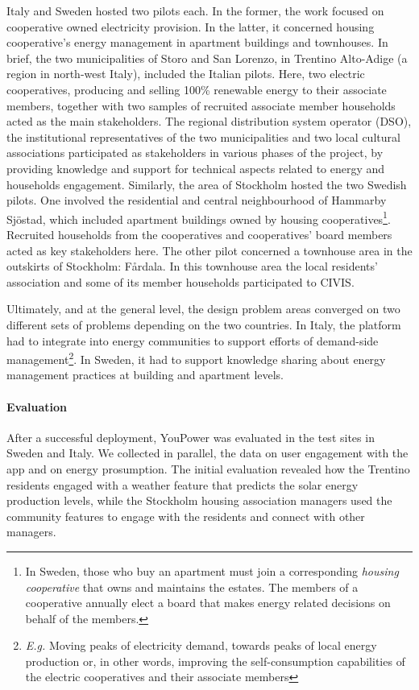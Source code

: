 Italy and Sweden hosted two pilots each. In the former, the work focused on cooperative owned 
electricity provision. In the latter, it concerned housing cooperative's energy management in 
apartment buildings and townhouses.  
In brief, the two municipalities of Storo and San Lorenzo, in Trentino Alto-Adige (a region in 
north-west Italy), included the Italian pilots. Here, two electric cooperatives, producing and 
selling 100\% renewable energy to their associate members, together with two samples of recruited 
associate member households acted as the main stakeholders. The regional distribution system 
operator (DSO), the institutional representatives of the two municipalities and two local cultural 
associations participated as stakeholders in various phases of the project, by providing knowledge 
and support for technical aspects related to energy and households engagement.
Similarly, the area of Stockholm hosted the two Swedish pilots. One involved the residential and 
central neighbourhood of Hammarby Sj\"{o}stad, which included apartment buildings owned by housing 
cooperatives\footnote{In Sweden, those who buy an apartment must join a corresponding \textit{housing cooperative} that owns and maintains the estates. The 
members of a cooperative annually elect a board that makes energy related decisions on behalf of 
the members.}. Recruited households from the cooperatives and cooperatives' board members acted
as key stakeholders here. %
The other pilot concerned a townhouse area in the outskirts of Stockholm: F\aa{}rdala. In this townhouse area the 
local residents’ association and some of its member households participated to CIVIS.

Ultimately, and at the general level, the design problem areas converged on two different sets of problems
depending on the two countries. In Italy, the platform had to integrate into energy communities to support
efforts of demand-side management\footnote{\textit{E.g.} Moving peaks of electricity demand, towards peaks of local energy
production or, in other words, improving the self-consumption capabilities of the electric cooperatives and
their associate members}. In Sweden, it had to support knowledge sharing about energy management practices at building and apartment levels.

\paragraph{Evaluation} After a successful deployment, YouPower was evaluated in the test sites in Sweden and Italy. We collected in parallel, the data on user engagement with the app and on energy prosumption. The initial evaluation revealed how the Trentino residents engaged with a weather feature that predicts the solar energy production levels, while the Stockholm housing association managers used the community features to engage with the residents and connect with other managers. 

